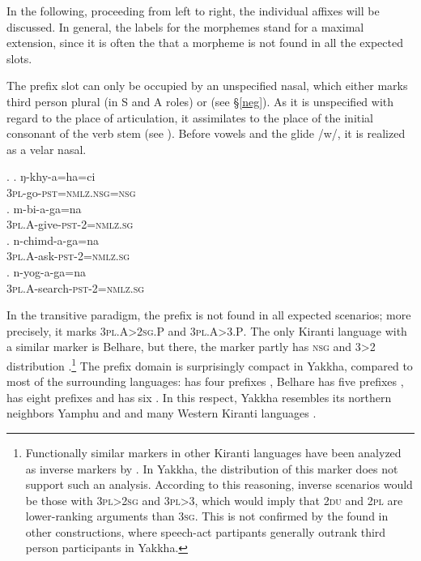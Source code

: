 In the following, proceeding from left to right, the individual affixes  will be discussed. In general, the labels for the morphemes stand for a maximal extension, since  it is often the  that a morpheme is not found in all the expected slots.

The prefix slot can only be occupied by an unspecified nasal, which either marks third person plural (in S and A roles) or  (see §\ref{neg}). As it is unspecified with regard to the place of articulation, it assimilates to the place of the initial consonant of the verb stem (see \Next). Before vowels and the glide /w/, it is realized as a velar nasal. 

\ex. \ag. ŋ-khy-a=ha=ci\\
		{\scshape 3pl}-go-{\scshape pst=nmlz.nsg=nsg}\\
	\bg. m-bi-a-ga=na\\
	{\scshape 3pl.A}-give{\scshape -pst-2=nmlz.sg}\\
\bg. n-chimd-a-ga=na\\
	{\scshape 3pl.A}-ask{\scshape -pst-2=nmlz.sg}\\
 \bg. n-yog-a-ga=na\\
	{\scshape 3pl.A}-search{\scshape -pst-2=nmlz.sg}\\
 
In the transitive paradigm, the prefix is not found in all expected scenarios; more precisely, it  marks {\scshape 3pl.A>2sg.P} and {\scshape 3pl.A>3.P}. The only Kiranti language with a similar marker is Belhare, but there, the marker partly has {\scshape nsg} and 3>2 distribution \citep[551]{Bickel2003Belhare}.\footnote{Functionally similar  markers in other Kiranti languages have been analyzed as inverse markers by \citet{Ebert1991Inverse}. In Yakkha, the distribution of this marker does not support such an analysis. According to this reasoning, inverse scenarios would be those with {\scshape 3pl>2sg} and {\scshape 3pl>3}, which would imply that {\scshape 2du} and {\scshape 2pl} are lower-ranking arguments than {\scshape 3sg}. This is not confirmed by the  found in other constructions, where speech-act partipants generally outrank third person participants in Yakkha.} The prefix domain is surprisingly compact in Yakkha, compared to most of the surrounding languages:  has four prefixes \citep{Driem1997A-new-analysis}, Belhare has five prefixes \citep{Bickel2003Belhare},  has eight prefixes \citep{Schikowski2012_Morphology} and  has six \citep{Doornenbal2009A-grammar}. In this respect, Yakkha resembles its northern neighbors  Yamphu and  \citep{Rutgers1998Yamphu, Tolsma1999A-grammar} and many Western Kiranti languages \citep[93]{Jacques2012_Agreement}. 

